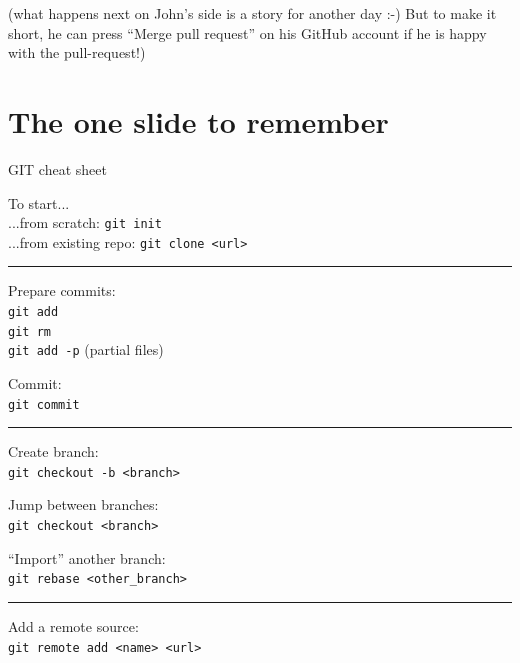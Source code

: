 \documentclass[compress]{beamer}
\begin{document}
\begin{frame}{}
    \centering
    (what happens next on John's side is a story for another day :-) But to make
    it short, he can press ``Merge pull request'' on his GitHub account if he is
    happy with the pull-request!)
\end{frame}


\section{The one slide to remember}

\begin{frame}{GIT cheat sheet}
\scriptsize
    \begin{multicols}{2}

    {\Medium To start...}\\
    ...from scratch: \texttt{git init}\\
    ...from existing repo: \texttt{git clone <url>}\par

    \rule{\columnwidth}{0.2pt}

    {\Medium Prepare commits:}\\
    \texttt{git add}\\
    \texttt{git rm}\\
    \texttt{git add -p} (partial files)\par

    {\Medium Commit:}\\
    \texttt{git commit}\par

    \rule{\columnwidth}{0.2pt}

    {\Medium Create branch:}\\
    \texttt{git checkout -b <branch>}\par

    {\Medium Jump between branches:}\\
    \texttt{git checkout <branch>}\par

    {\Medium ``Import'' another branch:}\\
    \texttt{git rebase <other\_branch>}\par

    \rule{\columnwidth}{0.2pt}

    {\Medium Add a remote source:}\\
    \texttt{git remote add <name> <url>}\par


\end{multicols}
\end{frame}
\end{document}
